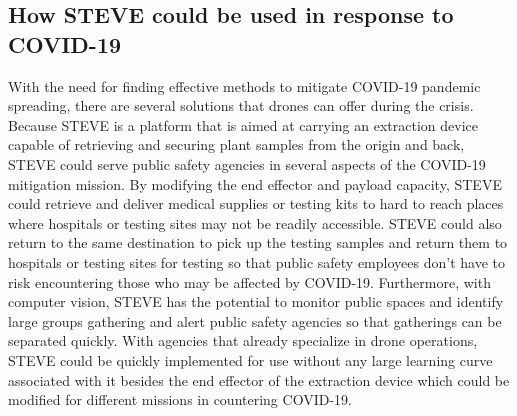\subsection*{How STEVE could be used in response to COVID-19}
With the need for finding effective methods to mitigate COVID-19 pandemic spreading, there are several solutions that drones can offer during the crisis. Because STEVE is a platform that is aimed at carrying an extraction device capable of retrieving and securing plant samples from the origin and back, STEVE could serve public safety agencies in several aspects of the COVID-19 mitigation mission. By modifying the end effector and payload capacity, STEVE could retrieve and deliver medical supplies or testing kits to hard to reach places where hospitals or testing sites may not be readily accessible. STEVE could also return to the same destination to pick up the testing samples and return them to hospitals or testing sites for testing so that public safety employees don’t have to risk encountering those who may be affected by COVID-19. Furthermore, with computer vision, STEVE has the potential to monitor public spaces and identify large groups gathering and alert public safety agencies so that gatherings can be separated quickly. With agencies that already specialize in drone operations, STEVE could be quickly implemented for use without any large learning curve associated with it besides the end effector of the extraction device which could be modified for different missions in countering COVID-19.








